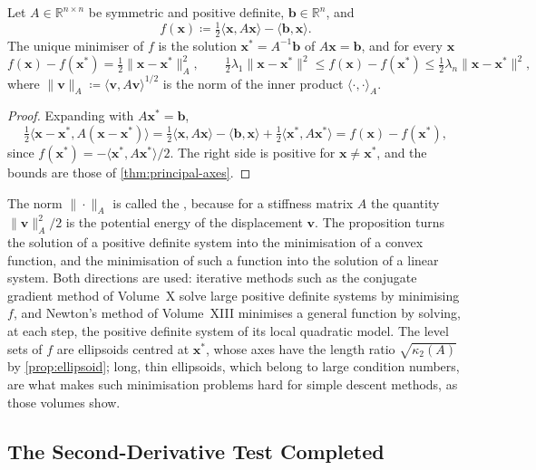 \begin{proposition}
\label{prop:energy-minimum}
Let $A\in\mathbb R^{n\times n}$ be symmetric and positive definite, $\mathbf b\in\mathbb R^n$, and
\[
f(\mathbf x)\coloneqq\tfrac12\langle\mathbf x,A\mathbf x\rangle-\langle\mathbf b,\mathbf x\rangle .
\]
The unique minimiser of $f$ is the solution $\mathbf x^*=A^{-1}\mathbf b$ of $A\mathbf x=\mathbf b$, and for every $\mathbf x$
\[
f(\mathbf x)-f(\mathbf x^*)=\tfrac12\|\mathbf x-\mathbf x^*\|_A^2,\qquad\tfrac12\lambda_1\|\mathbf x-\mathbf x^*\|^2\le f(\mathbf x)-f(\mathbf x^*)\le\tfrac12\lambda_n\|\mathbf x-\mathbf x^*\|^2,
\]
where $\|\mathbf v\|_A\coloneqq\langle\mathbf v,A\mathbf v\rangle^{1/2}$ is the norm of the inner product $\langle\cdot,\cdot\rangle_A$.
\end{proposition}

\begin{proof}
Expanding with $A\mathbf x^*=\mathbf b$,
\[
\tfrac12\langle\mathbf x-\mathbf x^*,A(\mathbf x-\mathbf x^*)\rangle=\tfrac12\langle\mathbf x,A\mathbf x\rangle-\langle\mathbf b,\mathbf x\rangle+\tfrac12\langle\mathbf x^*,A\mathbf x^*\rangle=f(\mathbf x)-f(\mathbf x^*),
\]
since $f(\mathbf x^*)=-\langle\mathbf x^*,A\mathbf x^*\rangle/2$. The right side is positive for $\mathbf x\ne\mathbf x^*$, and the bounds are those of \cref{thm:principal-axes}.
\end{proof}

The norm $\|\cdot\|_A$ is called the , because for a stiffness matrix $A$ the quantity $\|\mathbf v\|_A^2/2$ is the potential energy of the displacement $\mathbf v$. The proposition turns the solution of a positive definite system into the minimisation of a convex function, and the minimisation of such a function into the solution of a linear system. Both directions are used: iterative methods such as the conjugate gradient method of Volume~X solve large positive definite systems by minimising $f$, and Newton's method of Volume~XIII minimises a general function by solving, at each step, the positive definite system of its local quadratic model. The level sets of $f$ are ellipsoids centred at $\mathbf x^*$, whose axes have the length ratio $\sqrt{\kappa_2(A)}$ by \cref{prop:ellipsoid}; long, thin ellipsoids, which belong to large condition numbers, are what makes such minimisation problems hard for simple descent methods, as those volumes show.

\subsection{The Second-Derivative Test Completed}

